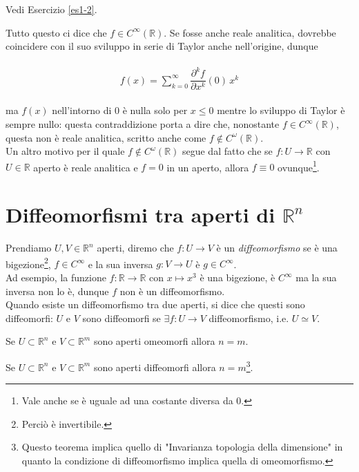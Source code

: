 Vedi Esercizio \ref{es1-2}.

Tutto questo ci dice che $ f \in C^{\infty}(\mathbb{R}) $. Se fosse anche reale analitica, dovrebbe coincidere con il suo sviluppo in serie di Taylor anche nell'origine, dunque

\begin{align}
	\begin{split}
		f(x) = \sum_{k=0}^{\infty} \dfrac{\partial^{k} f}{\partial x^{k}} (0) \, x^{k}
	\end{split}
\end{align}

ma $ f(x) $ nell'intorno di 0 è nulla solo per $ x \leqslant 0 $ mentre lo sviluppo di Taylor è sempre nullo: questa contraddizione porta a dire che, nonostante $ f \in C^{\infty}(\mathbb{R}) $, questa non è reale analitica, scritto anche come $ f \notin C^{\omega}(\mathbb{R}) $.\\
Un altro motivo per il quale $ f \notin C^{\omega}(\mathbb{R}) $ segue dal fatto che se $ f : U \to \mathbb{R} $ con $ U \in \mathbb{R} $ aperto è reale analitica e $ f = 0 $ in un aperto, allora $ f \equiv 0 $ ovunque\footnote{%
	Vale anche se è uguale ad una costante diversa da 0.}.

\section{Diffeomorfismi tra aperti di $ \mathbb{R}^{n} $}

Prendiamo $ U, V \in \mathbb{R}^{n} $ aperti, diremo che $ f : U \to V $ è un \textit{diffeomorfismo} se è una bigezione\footnote{%
	Perciò è invertibile.%
}, $ f \in C^{\infty} $ e la sua inversa $ g : V \to U $ è  $ g \in C^{\infty} $.\\
Ad esempio, la funzione $ f : \mathbb{R} \to \mathbb{R} $ con $ x \mapsto x^{3} $ è una bigezione, è $ C^{\infty} $ ma la sua inversa non lo è, dunque $ f $ non è un diffeomorfismo.\\
Quando esiste un diffeomorfismo tra due aperti, si dice che questi sono diffeomorfi: $ U $ e $ V $ sono diffeomorfi se $ \exists f : U \to V $ diffeomorfismo, i.e. $ U \simeq V $.\\

\begin{theorem}
	Se $ U \subset \mathbb{R}^{n} $ e $ V \subset \mathbb{R}^{m} $ sono aperti omeomorfi allora $ n = m $.
\end{theorem}

\begin{theorem}
	Se $ U \subset \mathbb{R}^{n} $ e $ V \subset \mathbb{R}^{m} $ sono aperti diffeomorfi allora $ n = m $\footnote{%
		Questo teorema implica quello di "Invarianza topologia della dimensione" in quanto la condizione di diffeomorfismo implica quella di omeomorfismo.}.
\end{theorem}

